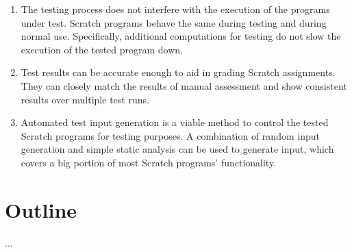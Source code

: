 \begin{enumerate}[(1)]
    \item The testing process does not interfere with the execution of the programs under test.
        Scratch programs behave the same during testing and during normal use.
        Specifically, additional computations for testing do not slow the execution of the tested program down.
    \item Test results can be accurate enough to aid in grading Scratch assignments.
        They can closely match the results of manual assessment and show consistent results over multiple test runs.
    \item Automated test input generation is a viable method to control the tested Scratch programs for testing purposes.
        A combination of random input generation and simple static analysis can be used to generate input, which covers a big portion of most Scratch programs' functionality.
\end{enumerate}

\section{Outline}
...

%
